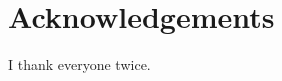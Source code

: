 \documentclass [11 pt,	a4paper]{report}
\begin{document}
	\chapter*{Acknowledgements}
	I thank everyone twice.
\end{document}
